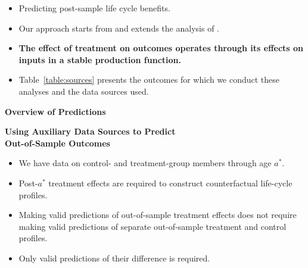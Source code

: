 \documentclass[static]{JJH-Beamer}
\begin{document}
\begin{frame}

\begin{itemize}
\item Predicting post-sample life cycle benefits.
\item Our approach starts from and extends the analysis of \citet{Heckman_Pinto_etal_2013_PerryFactor}.
\item \textbf{The effect of treatment on outcomes operates through its effects on inputs in a stable production function.}
\item Table~\ref{table:sources} presents the outcomes for which we conduct these analyses and the data sources used.
\end{itemize}

\end{frame}


\begin{frame}

\begin{center}
\textbf{Overview of Predictions}
\end{center}

\end{frame}

\begin{frame}

\begin{center}
\textbf{Using Auxiliary Data Sources to Predict\\ Out-of-Sample Outcomes}
\end{center}

\end{frame}

\begin{frame}

\begin{itemize}
\item We have data on control- and treatment-group members through age $a^{\ast}$.
\item Post-$a^{\ast}$ treatment effects are required to construct counterfactual life-cycle profiles.
\item Making valid predictions of out-of-sample treatment effects does not require making valid predictions of separate out-of-sample treatment and control profiles.
\item Only valid predictions of their difference is required.
\end{itemize}

\end{frame}
\end{document}
